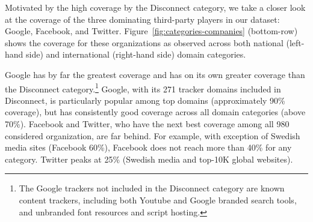 \documentclass[letterpaper]{sig-alternate-10pt}
\begin{document}


Motivated by the high coverage by the Disconnect category,
we take a closer look at the coverage of the three dominating third-party players
in our dataset: Google, Facebook, and Twitter.
Figure~\ref{fig:categories-companies} (bottom-row) shows the coverage for these organizations 
as observed across both national (left-hand side) and international (right-hand side) domain categories.

Google has by far the greatest coverage
and has on its own greater coverage than the Disconnect category.\footnote{
The Google trackers not included in the Disconnect category are known content trackers,
including both Youtube and Google branded search tools, and unbranded font resources and script hosting.}
Google, with its 271 tracker domains included in Disconnect, 
is particularly popular among top domains (approximately 90\% coverage),
but has consistently good coverage across all domain categories (above 70\%).
Facebook and Twitter, who have the next best coverage among all 980 considered organization,
are far behind.  For example, with exception of Swedish media sites 
(Facebook 60\%), Facebook does not reach more than 40\% for any category.
Twitter peaks at 25\% (Swedish media and top-10K global websites).

\end{document}
